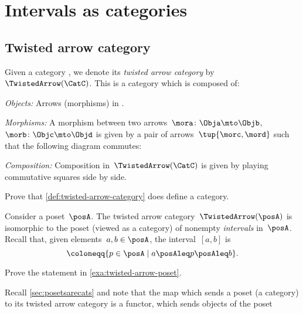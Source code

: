 \section{Intervals as categories}

\subsection{Twisted arrow category}

\begin{ctdefinition}\label{def:twisted-arrow-category}
  \label{def:twisted-arrow}
  Given a category \CatC, we denote its \emph{twisted arrow category} by~$\TwistedArrow(\CatC)$.
  This is a category which is composed of:
  \begin{compactenum}
    \item \emph{Objects:} Arrows (morphisms) in \CatC.
    \item \emph{Morphisms:} A morphism between two arrows~$\mora\colon \Obja \mto \Objb $,~$\morb\colon \Objc \mto \Objd$ is given by a pair of arrows~$\tup{\morc,\mord}$ such that the following diagram commutes:
    \begin{center}
    \end{center}
    \item \emph{Composition:} Composition in~$\TwistedArrow(\CatC)$ is given by playing commutative squares side by side.
  \end{compactenum}
\end{ctdefinition}

\begin{gradedexercise}\label{ex:TwistedCat}
Prove that \cref{def:twisted-arrow-category} does define a category.
\end{gradedexercise}



\begin{example}[Intervals]
  \label{exa:twisted-arrow-poset}
  Consider a poset~$\posA$.
  The twisted arrow category~$\TwistedArrow(\posA)$ is isomorphic to the poset (viewed as a category) of nonempty \emph{intervals} in~$\posA$.
  Recall that, given elements~$a, b \in \posA$, the interval~$[a,b]$ is
  \begin{equation*}
  [a,b]\coloneqq \{p \in \posA \mid a\posAleq p \posAleq b\}.
  \end{equation*}
\end{example}

\begin{exercise}
Prove the statement in \cref{exa:twisted-arrow-poset}.
\end{exercise}
\begin{solution}
\end{solution}
\begin{remark}
  Recall \cref{sec:posetsarecats} and note that the map which sends a poset (a category) to its twisted arrow category is a functor, which sends objects of the poset
\end{remark}
